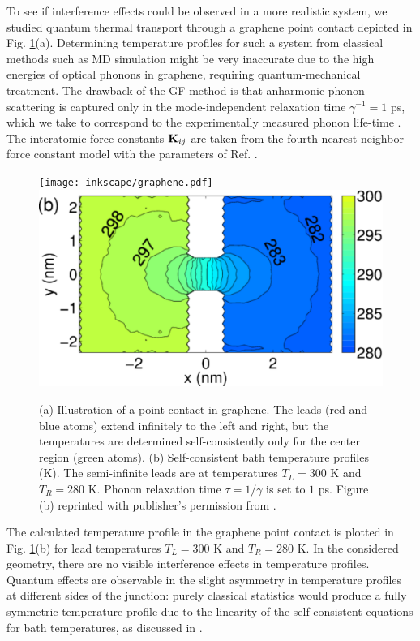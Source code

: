 To see if interference effects could be observed in a more realistic system, we studied quantum thermal transport through a graphene point contact depicted in Fig. \ref{fig:gf_fig8}(a). Determining temperature profiles for such a system from classical methods such as MD simulation might be very inaccurate due to the high energies of optical phonons in graphene, requiring quantum-mechanical treatment. The drawback of the GF method is that anharmonic phonon scattering is captured only in the mode-independent relaxation time $\gamma^{-1}=1$ ps, which we take to correspond to the experimentally measured phonon life-time \cite{bonini12}. The interatomic force constants $\mathbf{K}_{ij}$ are taken from the fourth-nearest-neighbor force constant model \cite{saito} with the parameters of Ref. \cite{wirtz04}. 

\begin{figure}
 \begin{center}
 \texttt{[image: inkscape/graphene.pdf]}
 \includegraphics[width=.49\columnwidth]{pics/gf_fig8b.pdf}
 \end{center}
 \caption{(a) Illustration of a point contact in graphene. The leads (red and blue atoms) extend infinitely to the left and right, but the temperatures are determined self-consistently only for the center region (green atoms). (b) Self-consistent bath temperature profiles (K). The semi-infinite leads are at temperatures $T_L=300$ K and $T_R=280$ K. Phonon relaxation time $\tau=1/\gamma$ is set to $1$ ps. Figure (b) reprinted with publisher's permission from .}
 \label{fig:gf_fig8}
\end{figure}

The calculated temperature profile in the graphene point contact is plotted in Fig. \ref{fig:gf_fig8}(b) for lead temperatures $T_L=300$ K and $T_R=280$ K. In the considered geometry, there are no visible interference effects in temperature profiles. Quantum effects are observable in the slight asymmetry in temperature profiles at different sides of the junction: purely classical statistics would produce a fully symmetric temperature profile due to the linearity of the self-consistent equations for bath temperatures, as discussed in .

